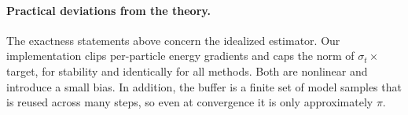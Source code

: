 \paragraph{Practical deviations from the theory.}
The exactness statements above concern the idealized estimator. Our implementation clips per-particle energy gradients and caps the norm of $\sigma_t\times$target, for stability and identically for all methods. Both are nonlinear and introduce a small bias. In addition, the buffer is a finite set of model samples that is reused across many steps, so even at convergence it is only approximately $\pi$.

